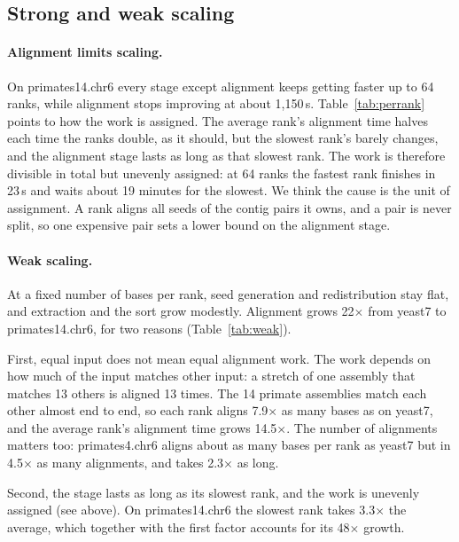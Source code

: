 \subsection{Strong and weak scaling}\label{sec:disc:small}

\paragraph{Alignment limits scaling.} On primates14.chr6 every stage except
alignment keeps getting faster up to 64 ranks, while alignment stops
improving at about 1,150\,s. Table~\ref{tab:perrank} points to how the
work is assigned. The average rank's alignment time halves each time the
ranks double, as it should, but the slowest rank's barely changes, and the
alignment stage lasts as long as that slowest rank. The work is therefore
divisible in total but unevenly assigned: at 64 ranks the fastest rank
finishes in 23\,s and waits about 19 minutes for the slowest. We think the cause is the unit of assignment. A rank aligns all seeds of
the contig pairs it owns, and a pair is never split, so one expensive pair
sets a lower bound on the alignment stage.

\paragraph{Weak scaling.} At a fixed number of bases per rank, seed
generation and redistribution stay flat, and extraction and the sort grow
modestly. Alignment grows
22$\times$ from yeast7 to primates14.chr6, for two reasons
(Table~\ref{tab:weak}).

First, equal input does not mean equal alignment work. The work depends on
how much of the input matches other input: a stretch of one assembly that
matches 13 others is aligned 13 times. The 14 primate assemblies match each
other almost end to end, so each rank aligns 7.9$\times$ as many bases as on
yeast7, and the average rank's alignment time grows 14.5$\times$. The
number of alignments matters too: primates4.chr6 aligns
about as many bases per rank as yeast7 but in 4.5$\times$ as many
alignments, and takes 2.3$\times$ as long.

Second, the stage lasts as long as its slowest rank, and the work is
unevenly assigned (see above). On
primates14.chr6 the slowest rank takes 3.3$\times$ the average, which
together with the first factor accounts for its 48$\times$ growth.
